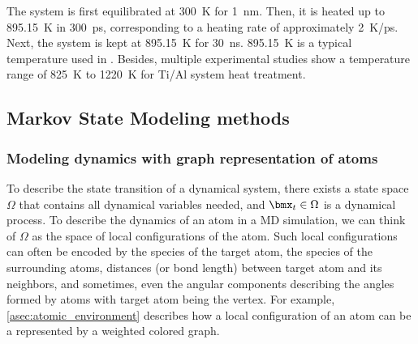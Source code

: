 The system is first equilibrated at \SI{300}{\kelvin} for \SI{1}{\nano\meter}. Then, it is heated up to \SI{895.15}{\kelvin} in \SI{300}{\pico\second}, corresponding to a heating rate of approximately \SI{2}{\kelvin/\pico\second}. Next, the system is kept at \SI{895.15}{\kelvin} for \SI{30}{\nano\second}. \SI{895.15}{\kelvin} is a typical temperature used in \cite{mirjalili2013kinetics}. Besides, multiple experimental studies show a temperature range of \SI{825}{\kelvin} to \SI{1220}{\kelvin} for Ti/Al system heat treatment.\cite{bizot2020reactivity,mirjalili2013kinetics,xu2006growth,sun2011multilayered,lazurenko2016explosively}

\subsection{Markov State Modeling methods}
\subsubsection{Modeling dynamics with graph representation of atoms}
To describe the state transition of a dynamical system, there exists a state space $\Omega$ that contains all dynamical variables needed, and $\bmx_t \in \Omega$ is a dynamical process. To describe the dynamics of an atom in a MD simulation, we can think of $\Omega$ as the space of local configurations of the atom. Such local configurations can often be encoded by the species of the target atom, the species of the surrounding atoms, distances (or bond length) between target atom and its neighbors, and sometimes, even the angular components describing the angles formed by atoms with target atom being the vertex. For example, \cref{asec:atomic_environment} describes how a local configuration of an atom can be a represented by a weighted colored graph.


